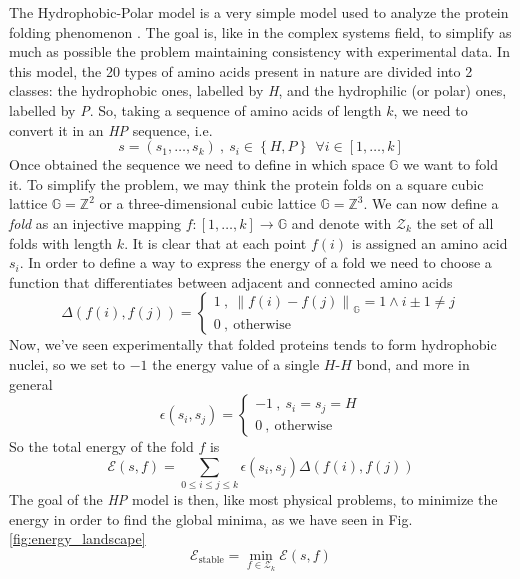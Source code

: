 The Hydrophobic-Polar model is a very simple model used to analyze the protein folding phenomenon \cite{PERM}.
The goal is, like in the complex systems field, to simplify as much as possible the problem maintaining consistency with experimental data.
In this model, the 20 types of amino acids present in nature are divided into 2 classes: the hydrophobic ones, labelled by \emph{H}, and the hydrophilic (or polar) ones, labelled by \emph{P}.
So, taking a sequence of amino acids of length $k$, we need to convert it in an \emph{HP} sequence, i.e.
\begin{equation*}
    s = \left(s_1, \ldots, s_k\right) \ , \ s_i \in \left\{H, P\right\} \ \ \forall i \in \left[1,\ldots,k\right]
\end{equation*}
Once obtained the sequence we need to define in which space $\mathbb{G}$ we want to fold it.
To simplify the problem, we may think the protein folds on a square cubic lattice $\mathbb{G} = \mathbb{Z}^2$ or a three-dimensional cubic lattice $\mathbb{G} = \mathbb{Z}^3$.
We can now define a \emph{fold} as an injective mapping $f : \left[1,\ldots,k\right] \to \mathbb{G}$ and denote with $\mathcal{Z}_k$ the set of all folds with length $k$.
It is clear that at each point $f(i)$ is assigned an amino acid $s_i$.
In order to define a way to express the energy of a fold we need to choose a function that differentiates between adjacent and connected amino acids
\begin{equation*}
    \Delta\left(f(i),f(j)\right) =
    \begin{cases}
        1 \ , \ {\left\lVert f(i) - f(j) \right\rVert}_\mathbb{G} = 1 \land i \pm 1 \neq j\\
        0 \ , \ \text{otherwise}
    \end{cases}
\end{equation*}
Now, we've seen experimentally that folded proteins tends to form hydrophobic nuclei, so we set to $-1$ the energy value of a single $H$-$H$ bond, and more in general
\begin{equation*}
    \epsilon\left(s_i,s_j\right) =
    \begin{cases}
        -1 \ , \ s_i = s_j = H\\
        0 \ , \ \text{otherwise}
    \end{cases}
\end{equation*}
So the total energy of the fold $f$ is
\begin{equation*}
    \mathcal{E}(s,f) = \sum_{0 \leq i \leq j \leq k} \epsilon\left(s_i,s_j\right)\Delta\left(f(i),f(j)\right)
\end{equation*}
The goal of the \emph{HP} model is then, like most physical problems, to minimize the energy in order to find the global minima, as we have seen in Fig. \ref{fig:energy_landscape}
\begin{equation*}
    \mathcal{E}_\text{stable} = \min_{f \in \mathcal{Z}_k} \mathcal{E}(s,f)
\end{equation*}
